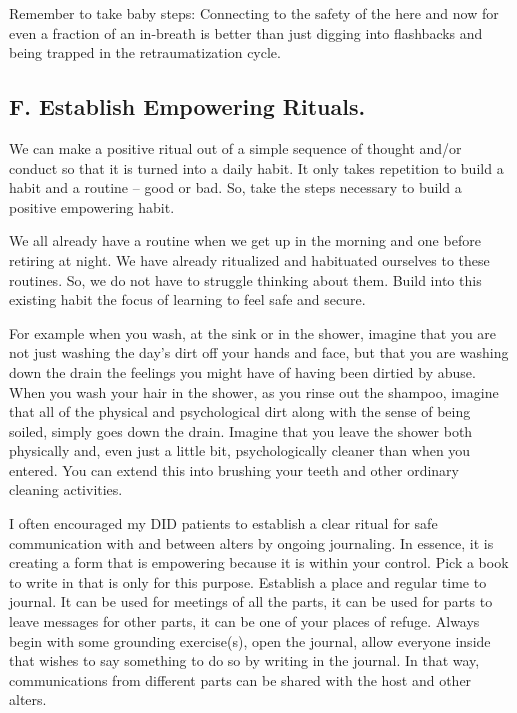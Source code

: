 \documentclass[]{book}
\begin{document}
Remember to take baby steps: Connecting to the safety of the here and now for even a fraction of an in-breath is better than just digging into flashbacks and being trapped in the retraumatization cycle.

\hypertarget{f.-establish-empowering-rituals.}{%
\subsection*{F. Establish Empowering Rituals.}\label{f.-establish-empowering-rituals.}}

We can make a positive ritual out of a simple sequence of thought and/or conduct so that it is turned into a daily habit. It only takes repetition to build a habit and a routine -- good or bad. So, take the steps necessary to build a positive empowering habit.

We all already have a routine when we get up in the morning and one before retiring at night. We have already ritualized and habituated ourselves to these routines. So, we do not have to struggle thinking about them. Build into this existing habit the focus of learning to feel safe and secure.

For example when you wash, at the sink or in the shower, imagine that you are not just washing the day's dirt off your hands and face, but that you are washing down the drain the feelings you might have of having been dirtied by abuse. When you wash your hair in the shower, as you rinse out the shampoo, imagine that all of the physical and psychological dirt along with the sense of being soiled, simply goes down the drain. Imagine that you leave the shower both physically and, even just a little bit, psychologically cleaner than when you entered. You can extend this into brushing your teeth and other ordinary cleaning activities.

I often encouraged my DID patients to establish a clear ritual for safe communication with and between alters by ongoing journaling. In essence, it is creating a form that is empowering because it is within your control. Pick a book to write in that is only for this purpose. Establish a place and regular time to journal. It can be used for meetings of all the parts, it can be used for parts to leave messages for other parts, it can be one of your places of refuge. Always begin with some grounding exercise(s), open the journal, allow everyone inside that wishes to say something to do so by writing in the journal. In that way, communications from different parts can be shared with the host and other alters.
\end{document}
